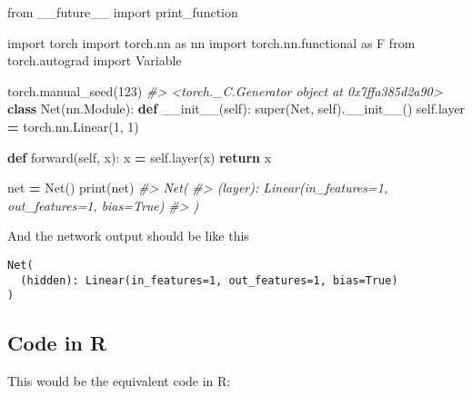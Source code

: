 \documentclass[]{book}
\newenvironment{Shaded}{\begin{snugshade}}{\end{snugshade}}
\newcommand{\BuiltInTok}[1]{#1}
\newcommand{\CommentTok}[1]{\textcolor[rgb]{0.56,0.35,0.01}{\textit{#1}}}
\newcommand{\ControlFlowTok}[1]{\textcolor[rgb]{0.13,0.29,0.53}{\textbf{#1}}}
\newcommand{\DecValTok}[1]{\textcolor[rgb]{0.00,0.00,0.81}{#1}}
\newcommand{\FunctionTok}[1]{\textcolor[rgb]{0.00,0.00,0.00}{#1}}
\newcommand{\ImportTok}[1]{#1}
\newcommand{\KeywordTok}[1]{\textcolor[rgb]{0.13,0.29,0.53}{\textbf{#1}}}
\newcommand{\NormalTok}[1]{#1}
\newcommand{\OperatorTok}[1]{\textcolor[rgb]{0.81,0.36,0.00}{\textbf{#1}}}
\newcommand{\VariableTok}[1]{\textcolor[rgb]{0.00,0.00,0.00}{#1}}
\begin{document}
\begin{Shaded}
\begin{Highlighting}[]
\ImportTok{from}\NormalTok{ __future__ }\ImportTok{import}\NormalTok{ print_function}

\ImportTok{import}\NormalTok{ torch}
\ImportTok{import}\NormalTok{ torch.nn }\ImportTok{as}\NormalTok{ nn}
\ImportTok{import}\NormalTok{ torch.nn.functional }\ImportTok{as}\NormalTok{ F}
\ImportTok{from}\NormalTok{ torch.autograd }\ImportTok{import}\NormalTok{ Variable}

\NormalTok{torch.manual_seed(}\DecValTok{123}\NormalTok{)}
\CommentTok{#> <torch._C.Generator object at 0x7ffa385d2a90>}
\KeywordTok{class}\NormalTok{ Net(nn.Module):}
   \KeywordTok{def} \FunctionTok{__init__}\NormalTok{(}\VariableTok{self}\NormalTok{):}
       \BuiltInTok{super}\NormalTok{(Net, }\VariableTok{self}\NormalTok{).}\FunctionTok{__init__}\NormalTok{()}
       \VariableTok{self}\NormalTok{.layer }\OperatorTok{=}\NormalTok{ torch.nn.Linear(}\DecValTok{1}\NormalTok{, }\DecValTok{1}\NormalTok{)}

   \KeywordTok{def}\NormalTok{ forward(}\VariableTok{self}\NormalTok{, x):}
\NormalTok{       x }\OperatorTok{=} \VariableTok{self}\NormalTok{.layer(x)      }
       \ControlFlowTok{return}\NormalTok{ x}

\NormalTok{net }\OperatorTok{=}\NormalTok{ Net()}
\BuiltInTok{print}\NormalTok{(net)}
\CommentTok{#> Net(}
\CommentTok{#>   (layer): Linear(in_features=1, out_features=1, bias=True)}
\CommentTok{#> )}
\end{Highlighting}
\end{Shaded}

And the network output should be like this

\begin{verbatim}
Net(
  (hidden): Linear(in_features=1, out_features=1, bias=True)
)
\end{verbatim}

\hypertarget{code-in-r}{%
\subsection{Code in R}\label{code-in-r}}

This would be the equivalent code in R:
\end{document}
